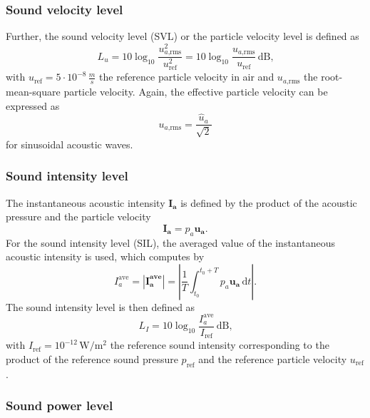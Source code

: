 \subsubsection*{Sound velocity level}
Further, the sound velocity level (SVL) or the particle velocity level is defined as
\begin{equation}
	L_u = 10\log_{10}\frac{u_{a\text{,rms}}^2}{u_\text{ref}^2} = 10\log_{10}\frac{u_{a\text{,rms}}}{u_\text{ref}}\,\text{dB}\text{,} 
\end{equation}
with $u_\text{ref} = 5\cdot10^{-8}\,\frac{m}{s}$ the reference particle velocity in air and $u_{a\text{,rms}}$ the root-mean-square particle velocity. Again, the effective particle velocity can be expressed as
\begin{equation}
	u_{a\text{,rms}} = \frac{\hat{u}_a}{\sqrt{2}}
\end{equation}
for sinusoidal acoustic waves.

\subsubsection*{Sound intensity level}

The instantaneous acoustic intensity $\boldsymbol{I_a}$ is defined by the product of the acoustic pressure and the particle velocity
\begin{equation}
	\boldsymbol{I_a} = p_a \boldsymbol{u_a}\text{.}
\end{equation} 
For the sound intensity level (SIL), the averaged value of the instantaneous acoustic intensity is used, which computes by
\begin{equation}
	I_a^{\text{ave}} = |\boldsymbol{I_a^{\text{ave}}}| = \left|\frac{1}{T}\int_{t_0}^{t_0 + T} p_a \boldsymbol{u_a}\,\text{d}t\right|\text{.}
\end{equation}
The sound intensity level is then defined as
\begin{equation}
	L_I = 10\log_{10}\frac{I_a^{\text{ave}}}{I_\text{ref}}\,\text{dB}\text{,}
\end{equation}
with $I_\text{ref} = 10^{-12}\,\text{W/}\text{m}^2$ the reference sound intensity corresponding to the product of the reference sound pressure $p_\text{ref}$ and the reference particle velocity $u_\text{ref}$.

\subsubsection*{Sound power level}

